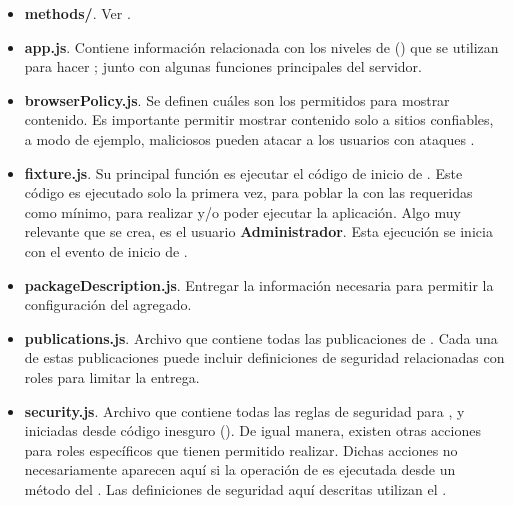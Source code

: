 \begin{itemize}
	\item
	 	\textbf{methods/}. Ver .
	\item
	 	\textbf{app.js}. Contiene información relacionada con los niveles de \bunyanNAME (\packageAS \bunyanPackage) que se utilizan para hacer \loggingCPT; junto con algunas funciones principales del servidor.
	\item
		\textbf{browserPolicy.js}. Se definen cuáles son los \websitesINT permitidos para mostrar contenido. Es importante permitir mostrar contenido solo a sitios confiables, a modo de ejemplo, \websitesINT maliciosos pueden atacar a los usuarios con ataques \clickjackingINT.
 	\item
	 	\textbf{fixture.js}. Su principal función es ejecutar el código de inicio de \fixturesPC. Este código es ejecutado solo la primera vez, para poblar la \dataBasesDB con las \collectionsMETEOR requeridas como mínimo, para realizar \testingCPT y/o poder ejecutar la aplicación. Algo muy relevante que se crea, es el usuario \textbf{Administrador}.  Esta ejecución se inicia con el evento de inicio de \meteorNAME.
	\item
		\textbf{packageDescription.js}. Entregar la información necesaria para permitir la configuración del \packageAS agregado.
	\item
		\textbf{publications.js}. Archivo que contiene todas las publicaciones de \documentsDB. Cada una de estas publicaciones puede incluir definiciones de seguridad relacionadas con roles para limitar la entrega.
	\item
	 	\textbf{security.js}. Archivo que contiene todas las reglas de seguridad para \insertsDB, \updatesDB y \removesDB iniciadas desde código inesguro (\clientsAS). De igual manera, existen otras acciones para roles específicos que tienen permitido realizar. Dichas acciones no necesariamente aparecen aquí si la operación de \dataBasesDB es ejecutada desde un método del \serverAS. Las definiciones de seguridad aquí descritas utilizan el \packageAS \securityPackage.
\end{itemize}


